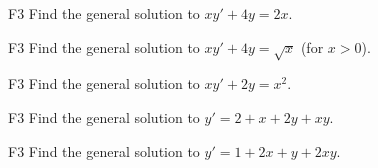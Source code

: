 \begin{problem}{F3}
Find the general solution to \(xy' + 4y = 2x\).
\end{problem}

\begin{problem}{F3}
Find the general solution to \(xy' + 4y = \sqrt{x}\) (for $x>0$).
\end{problem}

\begin{problem}{F3}
Find the general solution to \(xy' + 2y = x^2\).
\end{problem}

\begin{problem}{F3}
Find the general solution to \(y' = 2 + x + 2y + xy\).
\end{problem}

\begin{problem}{F3}
Find the general solution to \(y' = 1 + 2x + y + 2xy\).
\end{problem}

